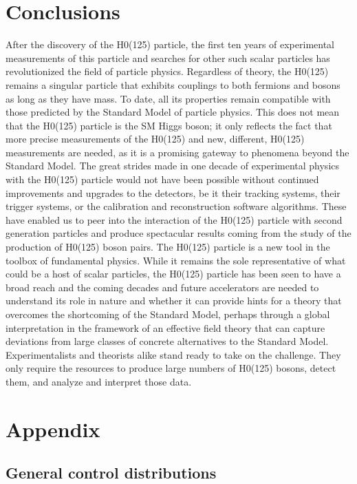 \documentclass[11pt]{article}
\begin{document}
\section{Conclusions}
\label{sec:org66f998e}
After the discovery of the H0(125) particle, the first ten years of experimental measurements of this particle and searches for
other such scalar particles has revolutionized the field of particle physics.
Regardless of theory, the H0(125) remains a singular particle that exhibits couplings to both fermions and bosons as long as they have mass.
To date, all its properties remain compatible with those predicted by the Standard Model of particle physics.
This does not mean that the H0(125) particle is the SM Higgs boson; it only reflects the fact that more precise measurements
of the H0(125) and new, different, H0(125) measurements are needed, as it is a promising gateway to phenomena beyond the
Standard Model.
The great strides made in one decade of experimental physics with the H0(125) particle would not have been possible without continued improvements and upgrades to the detectors, be it their tracking systems, their trigger systems, or the calibration and reconstruction software algorithms.
These have enabled us to peer into the interaction of the H0(125) particle with second generation particles and produce spectacular results coming from the study of the production of H0(125) boson pairs.
The H0(125) particle is a new tool in the toolbox of fundamental physics.
While it remains the sole representative of what could be a host of scalar particles, the H0(125) particle has been seen to have a broad reach and the coming decades and future accelerators are needed to understand its role in nature and whether it can provide hints for a theory that overcomes the shortcoming of the Standard Model, perhaps through a
global interpretation in the framework of an effective field theory that can capture deviations from large classes of concrete
alternatives to the Standard Model.
Experimentalists and theorists alike stand ready to take on the challenge.
They only require the resources to produce large numbers of H0(125) bosons, detect them, and analyze and interpret those data.
\cite{andre_david_higgs_ten_years}

\section{Appendix}
\label{sec:orga6963cb}
\subsection{General control distributions}
\label{sec:org244889c}
\end{document}

